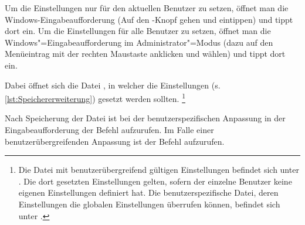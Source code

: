 Um die Einstellungen nur für den aktuellen Benutzer zu setzen,
öffnet man die Windows-Eingabeaufforderung
(Auf den -Knopf gehen und  eintippen)
und tippt dort  ein.
Um die Einstellungen für alle Benutzer zu setzen,
öffnet man die Windows"=Eingabeaufforderung im Administrator"=Modus
(dazu auf den Menüeintrag  mit der rechten Maustaste anklicken und  wählen)
und tippt dort  ein.

Dabei öffnet sich die Datei , in welcher die \og Einstellungen (s. \cref{lst:Speichererweiterung}) gesetzt werden sollten.%
\footnote{Die Datei  mit benutzerübergreifend gültigen Einstellungen befindet sich unter
.
Die dort gesetzten Einstellungen gelten, sofern der einzelne Benutzer keine eigenen Einstellungen definiert hat.
Die benutzerspezifische Datei, deren Einstellungen die globalen Einstellungen überrufen können, befindet sich unter
.}

Nach Speicherung der Datei ist bei der benutzerspezifischen Anpassung in der Eingabeaufforderung der Befehl
 aufzurufen.
Im Falle einer benutzerübergreifenden Anpassung ist der Befehl
aufzurufen.